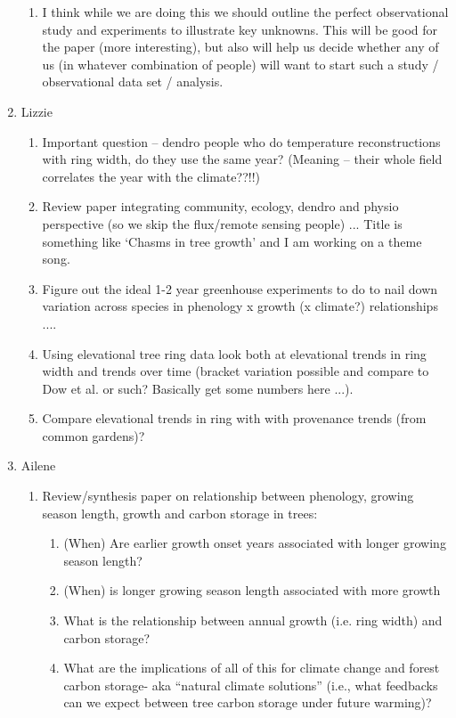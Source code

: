 \documentclass[11pt,letter]{article}
\begin{document}
\begin{enumerate}
\begin{enumerate}
\item I think while we are doing this we should outline the perfect observational study and experiments to illustrate key unknowns. This will be good for the paper (more interesting), but also will help us decide whether any of us (in whatever combination of people) will want to start such a study / observational data set / analysis.    
\end{enumerate}
\item Lizzie
\begin{enumerate}
\item Important question -- dendro people who do temperature reconstructions with ring width, do they use the same year? (Meaning -- their whole field correlates the year with the climate??!!)
\item Review paper integrating community, ecology, dendro and physio perspective (so we skip the flux/remote sensing people) ... Title is something like `Chasms in tree growth' and I am working on a theme song.
\item Figure out the ideal 1-2 year greenhouse experiments to do to nail down variation across species in phenology x growth (x climate?) relationships ....
\item Using elevational tree ring data look both at elevational trends in ring width and trends over time (bracket variation possible and compare to Dow et al. or such? Basically get some numbers here ...).
\item Compare elevational trends in ring with with provenance trends (from common gardens)?
\end{enumerate}
\item Ailene
\begin{enumerate}
\item Review/synthesis paper on relationship between phenology, growing season length, growth and carbon storage in trees:
\begin{enumerate}
\item (When) Are earlier growth onset years associated with longer growing season length?
\item  (When) is longer growing season length associated with more growth
\item  What is the relationship between annual growth (i.e. ring width) and carbon storage?
\item What are the implications of all of this for climate change and forest carbon storage- aka “natural climate solutions” (i.e., what feedbacks can we expect between tree carbon storage under future warming)?

\end{enumerate}
\end{enumerate}
\end{enumerate}
\end{document}
